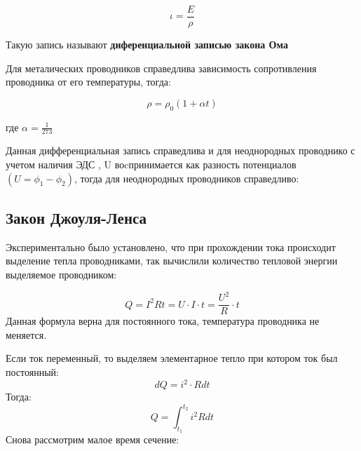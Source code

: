 \documentclass[../main.tex]{subfiles}
\begin{document}
\[\iota = \frac{E}{\rho}\]

 Такую запись называют \textbf{диференциальной записью закона Ома}

Для металических проводников справедлива  зависимость сопротивления проводника от его температуры, тогда:

\[\rho = \rho_0 (1 + \alpha t)\]
\begin{center}
    где $\alpha = \frac{1}{273}$
\end{center}

Данная дифференциальная запись справедлива и для неоднородных проводнико с учетом наличия ЭДС , U воcпринимается как разность потенциалов $(U = \phi_1 - \phi_2)$, тогда
для неоднородных проводников справедливо:

\vspace{5px}



\subsection{Закон Джоуля-Ленса}
Экспериментально было установлено, что при прохождении тока происходит выделение тепла проводниками, так вычислили количество тепловой энергии выделяемое проводником:

\[ Q = I^2 R t = U \cdot I \cdot t = \frac{U^2}{R} \cdot t\]
Данная формула верна для постоянного тока, температура проводника не меняется.

\vspace{5px}

Если ток переменный, то выделяем элементарное тепло при котором ток был постоянный:
\[dQ = i^2 \cdot R dt\]
Тогда:
\[Q = \int_{t_1}^{t_2} i^2 R dt\]
Снова рассмотрим малое время сечение:
\end{document}
